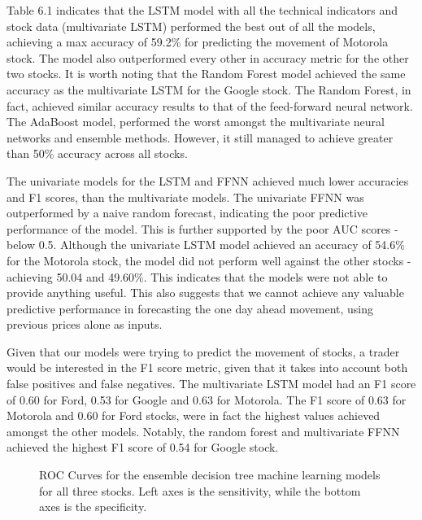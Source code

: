 Table 6.1 indicates that the LSTM model with all the technical indicators and stock data (multivariate LSTM) performed the best out of all the models, achieving a max accuracy of 59.2\% for predicting the movement of Motorola stock. The model also outperformed every other in accuracy metric for the other two stocks. It is worth noting that the Random Forest model achieved the same accuracy as the multivariate LSTM for the Google stock. The Random Forest, in fact, achieved similar accuracy results to that of the  feed-forward neural network.  The AdaBoost model, performed the worst amongst the multivariate neural networks and ensemble methods. However, it still managed to achieve greater than 50\% accuracy across all stocks. 


The univariate models for the LSTM and FFNN achieved much lower accuracies and F1 scores, than the multivariate models. The univariate FFNN was outperformed by a naive random forecast, indicating the poor predictive performance of the model. This is further supported by the poor AUC scores - below 0.5. Although the univariate LSTM model achieved an accuracy of 54.6\% for the Motorola stock, the model did not perform well against the other stocks - achieving 50.04 and 49.60\%. This indicates that the models were not able to provide anything useful. This also suggests that we cannot achieve any valuable predictive performance in forecasting the one day ahead movement, using previous prices alone as inputs.

 
Given that our models were trying to predict the movement of stocks, a trader would be interested in the F1 score metric, given that it takes into account both false positives and false negatives. The multivariate LSTM model had an F1 score of 0.60 for Ford, 0.53 for Google and 0.63 for Motorola. The F1 score of 0.63 for Motorola and 0.60 for Ford stocks, were in fact the highest values achieved amongst the other models. Notably, the random forest and multivariate FFNN achieved the highest F1 score of 0.54 for Google stock. 

\begin{figure}[!h]
    \centering
     \caption{\small{ROC Curves for the ensemble decision tree machine learning models for all three stocks. Left axes is the sensitivity, while the bottom axes is the specificity.}}
\label{}
\end{figure}


